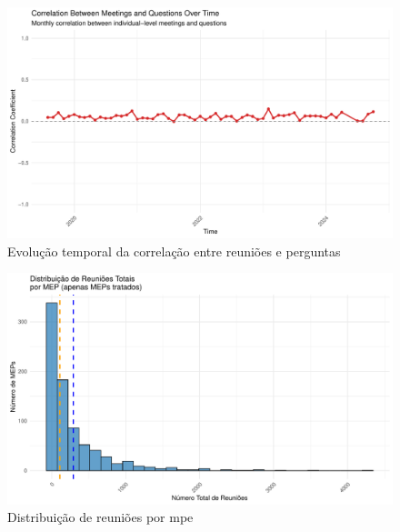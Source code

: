 \begin{figure}[htbp]
    \centering
    \includegraphics[width=\textwidth]{figures/descriptive_plots/fig3_correlation_meetings_questions.pdf}
    \caption{Evolução temporal da correlação entre reuniões e perguntas}
    \label{fig:correlation_meetings_questions}
\end{figure}

\begin{figure}[htbp]
    \centering
    \includegraphics[width=\textwidth]{figures/descriptive_plots/fig3.1_meetings_hist.pdf}
    \caption{Distribuição de reuniões por \acrshort{mpe}}
    \label{fig:meetings_hist}
\end{figure}


